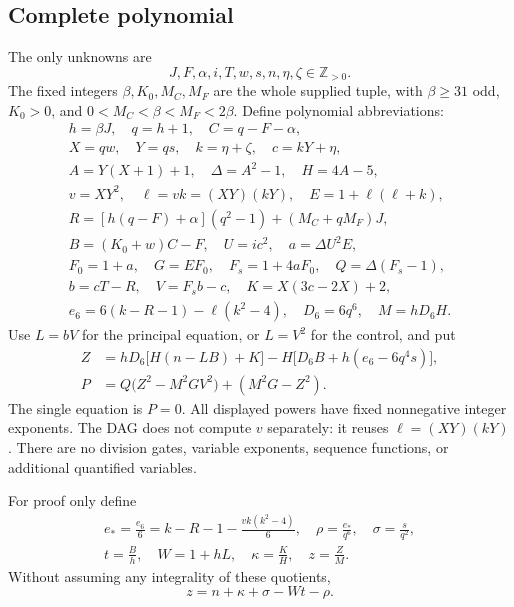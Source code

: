\subsection{Complete polynomial}
The only unknowns are
\[
 J,F,\alpha,i,T,w,s,n,\eta,\zeta\in\mathbb Z_{>0}.
\]
The fixed integers \(\beta,K_0,M_C,M_F\) are the whole supplied tuple,
with \(\beta\ge31\) odd, \(K_0>0\), and
\(0<M_C<\beta<M_F<2\beta\).  Define polynomial abbreviations:
\begin{gather*}
 h=\beta J,\quad q=h+1,\quad C=q-F-\alpha,\\
 X=qw,\quad Y=qs,\quad k=\eta+\zeta,\quad c=kY+\eta,\\
 A=Y(X+1)+1,\quad \Delta=A^2-1,\quad H=4A-5,\\
 v=XY^2,\quad \ell=vk=(XY)(kY),\quad E=1+\ell(\ell+k),\\
 R=[h(q-F)+\alpha](q^2-1)+(M_C+qM_F)J,\\
 B=(K_0+w)C-F,\quad U=ic^2,\quad a=\Delta U^2E,\\
 F_0=1+a,\quad G=EF_0,\quad F_s=1+4aF_0,\quad Q=\Delta(F_s-1),\\
 b=cT-R,\quad V=F_sb-c,\quad K=X(3c-2X)+2,\\
 e_6=6(k-R-1)-\ell(k^2-4),\quad D_6=6q^6,\quad M=hD_6H.
\end{gather*}
Use \(L=bV\) for the principal equation, or \(L=V^2\) for the control,
and put
\begin{align}
 Z&=hD_6\bigl[H(n-LB)+K\bigr]
       -H\bigl[D_6B+h(e_6-6q^4s)\bigr],\label{eq:inverse-Z}\\
 P&=Q\bigl(Z^2-M^2GV^2\bigr)+(M^2G-Z^2).\label{eq:inverse-P}
\end{align}
The single equation is \(P=0\).  All displayed powers have fixed
nonnegative integer exponents.  The DAG does not compute \(v\)
separately: it reuses \(\ell=(XY)(kY)\).  There are no division gates,
variable exponents, sequence functions, or additional quantified variables.

For proof only define
\begin{gather*}
 e_*=\frac{e_6}{6}=k-R-1-\frac{vk(k^2-4)}{6},\quad
 \rho=\frac{e_*}{q^6},\quad\sigma=\frac{s}{q^2},\\
 t=\frac{B}{h},\quad W=1+hL,\quad
 \kappa=\frac{K}{H},\quad z=\frac{Z}{M}.
\end{gather*}
Without assuming any integrality of these quotients,
\begin{equation}
 z=n+\kappa+\sigma-Wt-\rho.\label{eq:inverse-carrier}
\end{equation}


